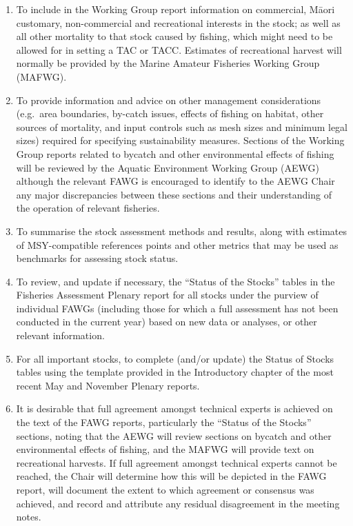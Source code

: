 \documentclass{mpi-plenary}
\theoremstyle{definition}
\theoremstyle{definition}
\theoremstyle{definition}
\theoremstyle{remark}
\begin{document}
\begin{enumerate}
\def\labelenumi{\arabic{enumi}.}
\setcounter{enumi}{9}
\item
  To include in the Working Group report information on commercial,
  Māori customary, non-commercial and recreational interests in the
  stock; as well as all other mortality to that stock caused by fishing,
  which might need to be allowed for in setting a TAC or TACC. Estimates
  of recreational harvest will normally be provided by the Marine
  Amateur Fisheries Working Group (MAFWG).
\item
  To provide information and advice on other management considerations
  (e.g.~area boundaries, by-catch issues, effects of fishing on habitat,
  other sources of mortality, and input controls such as mesh sizes and
  minimum legal sizes) required for specifying sustainability measures.
  Sections of the Working Group reports related to bycatch and other
  environmental effects of fishing will be reviewed by the Aquatic
  Environment Working Group (AEWG) although the relevant FAWG is
  encouraged to identify to the AEWG Chair any major discrepancies
  between these sections and their understanding of the operation of
  relevant fisheries.
\item
  To summarise the stock assessment methods and results, along with
  estimates of MSY-compatible references points and other metrics that
  may be used as benchmarks for assessing stock status.
\item
  To review, and update if necessary, the ``Status of the Stocks''
  tables in the Fisheries Assessment Plenary report for all stocks under
  the purview of individual FAWGs (including those for which a full
  assessment has not been conducted in the current year) based on new
  data or analyses, or other relevant information.
\item
  For all important stocks, to complete (and/or update) the Status of
  Stocks tables using the template provided in the Introductory chapter
  of the most recent May and November Plenary reports.
\item
  It is desirable that full agreement amongst technical experts is
  achieved on the text of the FAWG reports, particularly the ``Status of
  the Stocks'' sections, noting that the AEWG will review sections on
  bycatch and other environmental effects of fishing, and the MAFWG will
  provide text on recreational harvests. If full agreement amongst
  technical experts cannot be reached, the Chair will determine how this
  will be depicted in the FAWG report, will document the extent to which
  agreement or consensus was achieved, and record and attribute any
  residual disagreement in the meeting notes.
\end{enumerate}
\end{document}

